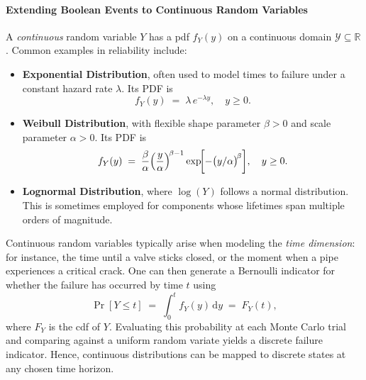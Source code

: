 \paragraph{Extending Boolean Events to Continuous Random Variables}
A \emph{continuous} random variable \(Y\) has a \acrfull{pdf} \(f_Y(y)\) on a continuous domain \(\mathcal{Y}\subseteq \mathbb{R}\). Common examples in reliability include:
\begin{itemize}
\item \textbf{Exponential Distribution}, often used to model times to failure under a constant hazard rate \(\lambda\). Its PDF is
\[
f_Y(y) \;=\; \lambda\, e^{-\lambda y},
\quad
y \ge 0.
\]
\item \textbf{Weibull Distribution}, with flexible shape parameter \(\beta>0\) and scale parameter \(\alpha>0\). Its PDF is
\[
f_Y(y)
\;=\;
\frac{\beta}{\alpha}
\Bigl(\frac{y}{\alpha}\Bigr)^{\!\beta -1}
\exp\!\biggl[-\bigl(y/\alpha\bigr)^{\!\beta}\biggr],
\quad
y\ge 0.
\]
\item \textbf{Lognormal Distribution}, where \(\log(Y)\) follows a normal distribution. This is sometimes employed for components whose lifetimes span multiple orders of magnitude.
\end{itemize}
Continuous random variables typically arise when modeling the \emph{time dimension}: for instance, the time until a valve sticks closed, or the moment when a pipe experiences a critical crack. One can then generate a Bernoulli indicator for whether the failure has occurred by time \(t\) using
\[
\Pr[Y \le t]
\;=\;
\int_{0}^{t} f_Y(y)\,\mathrm{d}y
\;=\;
F_Y(t),
\]
where \(F_Y\) is the \acrfull{cdf} of \(Y\). Evaluating this probability at each Monte Carlo trial and comparing against a uniform random variate yields a discrete failure indicator. Hence, continuous distributions can be mapped to discrete states at any chosen time horizon.




